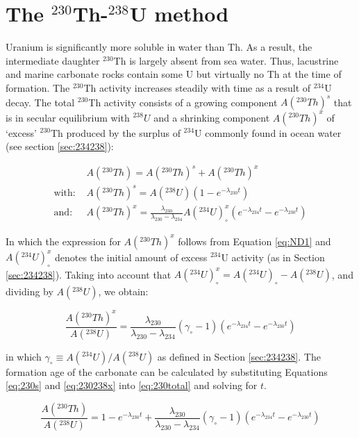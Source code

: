 \documentclass{book}
\begin{document}
\section{The $^{230}$Th-$^{238}$U method}
\label{sec:230238}

Uranium is significantly more soluble in water than Th. As a result,
the intermediate daughter $^{230}$Th is largely absent from sea
water. Thus, lacustrine and marine carbonate rocks contain some U but
virtually no Th at the time of formation. The $^{230}$Th activity
increases steadily with time as a result of $^{234}$U decay. The total
$^{230}$Th activity consists of a growing component $A(^{230}Th)^s$
that is in secular equilibrium with $^{238}U$ and a shrinking
component $A(^{230}Th)^x$ of `excess' $^{230}$Th produced by the
surplus of $^{234}$U commonly found in ocean water (see section
\ref{sec:234238}):

\begin{align}
~ & A(^{230}Th) =  A(^{230}Th)^s + A(^{230}Th)^x \label{eq:230total}\\
\mbox{with:~} & A(^{230}Th)^s = A(^{238}U) (1-e^{-\lambda_{230}t}) \label{eq:230s}\\
\mbox{and:~} & A(^{230}Th)^x = \frac{\lambda_{230}}{\lambda_{230}-\lambda_{234}} 
A(^{234}U)_\circ^x\left(e^{-\lambda_{234}t}-e^{-\lambda_{230}t}\right) \label{eq:230x}
\end{align}

In which the expression for $A(^{230}Th)^x$ follows from Equation
\ref{eq:ND1} and $A(^{234}U)_\circ^x$ denotes the initial amount of
excess $^{234}$U activity (as in Section \ref{sec:234238}). Taking
into account that $A(^{234}U)_\circ^x = A(^{234}U)_\circ -
A(^{238}U)$, and dividing by $A(^{238}U)$, we obtain:

\begin{equation}
\frac{A(^{230}Th)^x}{A(^{238}U)} = \frac{\lambda_{230}}{\lambda_{230}-\lambda_{234}} (\gamma_\circ-1)
\left(e^{-\lambda_{234}t}-e^{-\lambda_{230}t}\right)
\label{eq:230238x}
\end{equation}

in which $\gamma_\circ \equiv A(^{234}U)/A(^{238}U)$ as defined in
Section \ref{sec:234238}. The formation age of the carbonate can be
calculated by substituting Equations \ref{eq:230s} and \ref{eq:230238x}
into \ref{eq:230total} and solving for $t$. 

\begin{equation}
  \frac{A(^{230}Th)}{A(^{238}U)} = 1 - e^{-\lambda_{230}t} +
  \frac{\lambda_{230}}{\lambda_{230}-\lambda_{234}} (\gamma_\circ-1)
\left(e^{-\lambda_{234}t}-e^{-\lambda_{230}t}\right)
\label{eq:230238}
\end{equation}
\end{document}
